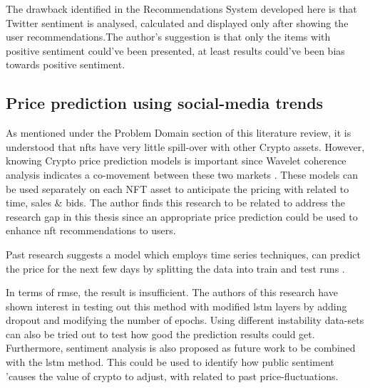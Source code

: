 The drawback identified in the Recommendations System developed here is that Twitter sentiment is analysed, calculated and displayed only after showing the user recommendations.The author's suggestion is that only the items with positive sentiment could've been presented, at least results could've been bias towards positive sentiment.


\subsection{Price prediction using social-media trends}






As mentioned under the Problem Domain section of this literature review, it is understood that \gls{nft}s have very little spill-over with other Crypto assets. However, knowing Crypto price prediction models is important since Wavelet coherence analysis indicates a co-movement between these two markets \autocite{dowling_is_2021}.
These models can be used separately on each NFT asset to anticipate the pricing with related to time, sales \& bids.
The author finds this research to be related to address the research gap in this thesis since an appropriate price prediction could be used to enhance \Gls{nft}  recommendations to users.

Past research suggests a model which employs time series techniques, can predict the price for the next few days by splitting the data into train and test runs \autocite{ferdiansyah_lstm-method_2019}.

In terms of \gls{rmse}, the result is insufficient. The authors of this research have shown interest in testing out this method with modified \gls{lstm} layers by adding dropout and modifying the number of epochs. Using different instability data-sets can also be tried out to test how good the prediction results could get. 
Furthermore, sentiment analysis is also proposed as future work to be combined with the \gls{lstm} method. This could be used to identify how public sentiment 'causes the value of crypto to adjust, with related to past price-fluctuations.

